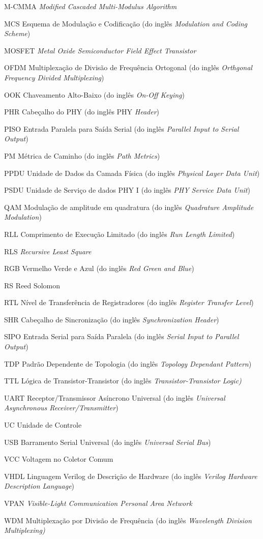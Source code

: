 \documentclass[
	12pt,				%
	openright,			%
	oneside,			%
	a4paper,			%
	hyphens,			%
	english,			%
	brazil				%
]{abntex2}
\begin{document}
\begin{siglas}
		\item[M-CMMA] \emph{Modified Cascaded Multi-Modulus Algorithm}
		\item[MCS] Esquema de Modulação e Codificação (do inglês \emph{Modulation and Coding Scheme})
		\item[MOSFET] \emph{Metal Oxide Semiconductor Field Effect Transistor}
		\item[OFDM] Multiplexação de Divisão de Frequência Ortogonal (do inglês \emph{Orthgonal Frequency Divided Multiplexing})
		\item[OOK] Chaveamento Alto-Baixo (do inglês \emph{On-Off Keying})
		\item[PHR] Cabeçalho do PHY (do inglês PHY \emph{Header})
		\item[PISO] Entrada Paralela para Saída Serial (do inglês \emph{Parallel Input to Serial Output})
		\item[PM] Métrica de Caminho (do inglês \emph{Path Metrics})
		\item[PPDU] Unidade de Dados da Camada Física (do inglês \emph{Physical Layer Data Unit})
		\item[PSDU] Unidade de Serviço de dados PHY I (do inglês \emph{PHY Service Data Unit})
		\item[QAM] Modulação de amplitude em quadratura (do inglês \emph{Quadrature Amplitude Modulation})
		\item[RLL] Comprimento de Execução Limitado (do inglês \emph{Run Length Limited})
		\item[RLS] \emph{Recursive Least Square}
		\item[RGB] Vermelho Verde e Azul (do inglês \emph{Red Green and Blue})
		\item[RS] Reed Solomon
		\item[RTL] Nível de Transferência de Registradores (do inglês \emph{Register Transfer Level})
		\item[SHR] Cabeçalho de Sincronização (do inglês \emph{Synchronization Header})
		\item[SIPO] Entrada Serial para Saída Paralela (do inglês \emph{Serial Input to Parallel Output})
		\item[TDP] Padrão Dependente de Topologia (do inglês \emph{Topology Dependant Pattern})
		\item[TTL] Lógica de Transistor-Transistor (do inglês \emph{Transistor-Transistor Logic)}
		\item[UART] Receptor/Transmissor Asíncrono Universal (do inglês \emph{Universal Asynchronous Receiver/Transmitter})
		\item[UC] Unidade de Controle
		\item[USB] Barramento Serial Universal (do inglês \emph{Universal Serial Bus})
		\item[VCC] Voltagem no Coletor Comum
		\item[VHDL] Linguagem Verilog de Descrição de Hardware (do inglês \emph{Verilog Hardware Description Language})
		\item[VPAN] \emph{Visible-Light Communication Personal Area Network}
		\item[WDM] Multiplexação por Divisão de Frequência (do inglês \emph{Wavelength Division Multiplexing)}
	\end{siglas}
\end{document}
